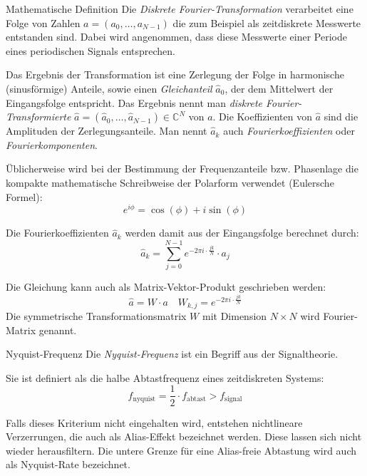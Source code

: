 \begin{defi}{Mathematische Definition}
    Die \emph{Diskrete Fourier-Transformation} verarbeitet eine Folge von Zahlen $a = (a_0, \ldots, a_{N-1})$ die zum Beispiel als zeitdiskrete Messwerte entstanden sind. Dabei wird angenommen, dass diese Messwerte einer Periode eines periodischen Signals entsprechen.

    Das Ergebnis der Transformation ist eine Zerlegung der Folge in harmonische (sinusförmige) Anteile, sowie einen \emph{Gleichanteil} $\hat{a}_0$, der dem Mittelwert der Eingangsfolge entspricht.
    Das Ergebnis nennt man \emph{diskrete Fourier-Transformierte} $\hat{a} = ( \hat{a}_0, \ldots, \hat{a}_{N-1} ) \in \mathbb{C}^N$ von $a$.
    Die Koeffizienten von $\hat{a}$ sind die Amplituden der Zerlegungsanteile.
    Man nennt $\hat{a}_k$ auch \emph{Fourierkoeffizienten} oder \emph{Fourierkomponenten}.

    Üblicherweise wird bei der Bestimmung der Frequenzanteile bzw. Phasenlage die kompakte mathematische Schreibweise der Polarform verwendet (Eulersche Formel):
    \[
        e^{i\phi} = \cos(\phi) + i \sin(\phi)
    \]

    Die Fourierkoeffizienten $\hat{a}_{k}$ werden damit aus der Eingangsfolge berechnet durch:
    \[
        \hat{a}_{k} = \sum _{j=0}^{N-1} e^{-2\pi i \cdot \frac {jk}{N}} \cdot a_{j}
    \]

    Die Gleichung kann auch als Matrix-Vektor-Produkt geschrieben werden:
    \[
        \hat{a} = W \cdot a \quad W_{k, j} = e^{-2\pi i \cdot \frac {jk}{N}}
    \]
    Die symmetrische Transformationsmatrix $W$ mit Dimension $N \times N$ wird Fourier-Matrix genannt.
\end{defi}

\begin{bonus}{Nyquist-Frequenz}
    Die \emph{Nyquist-Frequenz} ist ein Begriff aus der Signaltheorie.

    Sie ist definiert als die halbe Abtastfrequenz eines zeitdiskreten Systems:
    \[
        f_{\text{nyquist}} = \frac {1}{2} \cdot f_{\text{abtast}} > f_{\text{signal}}
    \]

    Falls dieses Kriterium nicht eingehalten wird, entstehen nichtlineare Verzerrungen, die auch als Alias-Effekt bezeichnet werden. Diese lassen sich nicht wieder herausfiltern.
    Die untere Grenze für eine Alias-freie Abtastung wird auch als Nyquist-Rate bezeichnet.
\end{bonus}

